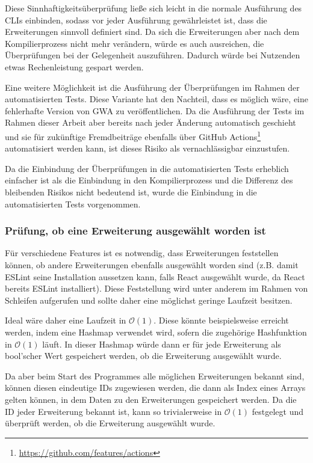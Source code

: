 Diese Sinnhaftigkeitsüberprüfung ließe sich leicht in die normale Ausführung des \gls{CLI}s einbinden, sodass vor jeder Ausführung gewährleistet ist, dass die Erweiterungen sinnvoll definiert sind. Da sich die Erweiterungen aber nach dem Kompilierprozess nicht mehr verändern, würde es auch ausreichen, die Überprüfungen bei der Gelegenheit auszuführen. Dadurch würde bei Nutzenden etwas Rechenleistung gespart werden.

Eine weitere Möglichkeit ist die Ausführung der Überprüfungen im Rahmen der automatisierten Tests. Diese Variante hat den Nachteil, dass es möglich wäre, eine fehlerhafte Version von \gls{GWA} zu veröffentlichen. Da die Ausführung der Tests im Rahmen dieser Arbeit aber bereits nach jeder Änderung automatisch geschieht und sie für zukünftige Fremdbeiträge ebenfalls über GitHub Actions\footnote{\url{https://github.com/features/actions}} automatisiert werden kann, ist dieses Risiko als vernachlässigbar einzustufen.

Da die Einbindung der Überprüfungen in die automatisierten Tests erheblich einfacher ist als die Einbindung in den Kompilierprozess und die Differenz des bleibenden Risikos nicht bedeutend ist, wurde die Einbindung in die automatisierten Tests vorgenommen.

\subsubsection{Prüfung, ob eine Erweiterung ausgewählt worden ist}
Für verschiedene Features ist es notwendig, dass Erweiterungen feststellen können, ob andere Erweiterungen ebenfalls ausgewählt worden sind (z.B. damit ESLint seine Installation aussetzen kann, falls React ausgewählt wurde, da React bereits ESLint installiert). Diese Feststellung wird unter anderem im Rahmen von Schleifen aufgerufen und sollte daher eine möglichst geringe Laufzeit besitzen.

Ideal wäre daher eine Laufzeit in $\mathcal{O}(1)$. Diese könnte beispielsweise erreicht werden, indem eine Hashmap verwendet wird, sofern die zugehörige Hashfunktion in $\mathcal{O}(1)$ läuft. In dieser Hashmap würde dann er für jede Erweiterung als bool'scher Wert gespeichert werden, ob die Erweiterung ausgewählt wurde.

Da aber beim Start des Programmes alle möglichen Erweiterungen bekannt sind, können diesen eindeutige IDs zugewiesen werden, die dann als Index eines Arrays gelten können, in dem Daten zu den Erweiterungen gespeichert werden. Da die ID jeder Erweiterung bekannt ist, kann so trivialerweise in $\mathcal{O}(1)$ festgelegt und überprüft werden, ob die Erweiterung ausgewählt wurde.

